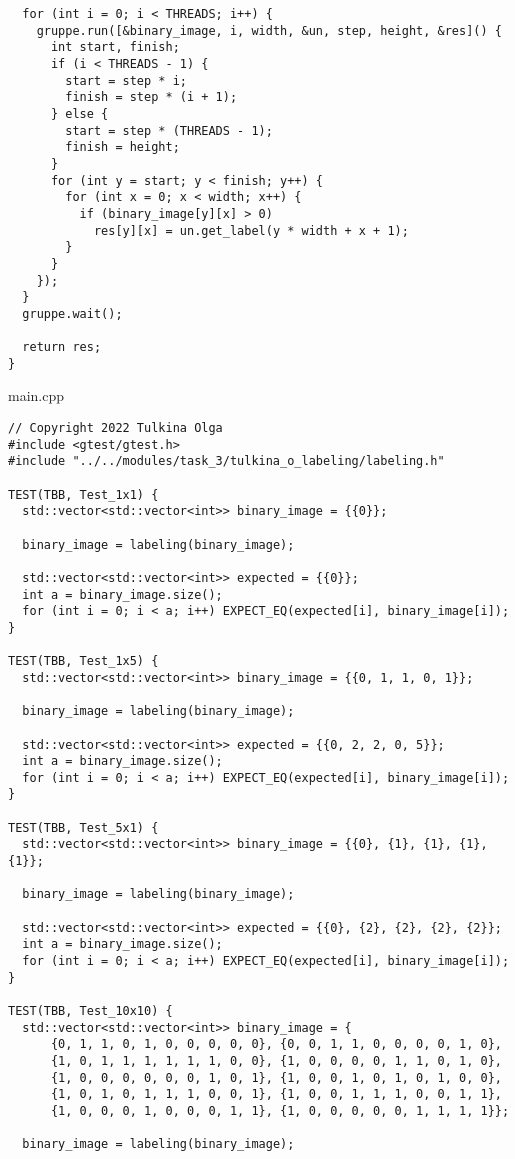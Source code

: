 \documentclass[12pt]{article}
\begin{document}
\begin{lstlisting}
  for (int i = 0; i < THREADS; i++) {
    gruppe.run([&binary_image, i, width, &un, step, height, &res]() {
      int start, finish;
      if (i < THREADS - 1) {
        start = step * i;
        finish = step * (i + 1);
      } else {
        start = step * (THREADS - 1);
        finish = height;
      }
      for (int y = start; y < finish; y++) {
        for (int x = 0; x < width; x++) {
          if (binary_image[y][x] > 0)
            res[y][x] = un.get_label(y * width + x + 1);
        }
      }
    });
  }
  gruppe.wait();

  return res;
}
\end{lstlisting}
main.cpp
\begin{lstlisting}
// Copyright 2022 Tulkina Olga
#include <gtest/gtest.h>
#include "../../modules/task_3/tulkina_o_labeling/labeling.h"

TEST(TBB, Test_1x1) {
  std::vector<std::vector<int>> binary_image = {{0}};

  binary_image = labeling(binary_image);

  std::vector<std::vector<int>> expected = {{0}};
  int a = binary_image.size();
  for (int i = 0; i < a; i++) EXPECT_EQ(expected[i], binary_image[i]);
}

TEST(TBB, Test_1x5) {
  std::vector<std::vector<int>> binary_image = {{0, 1, 1, 0, 1}};

  binary_image = labeling(binary_image);

  std::vector<std::vector<int>> expected = {{0, 2, 2, 0, 5}};
  int a = binary_image.size();
  for (int i = 0; i < a; i++) EXPECT_EQ(expected[i], binary_image[i]);
}

TEST(TBB, Test_5x1) {
  std::vector<std::vector<int>> binary_image = {{0}, {1}, {1}, {1}, {1}};

  binary_image = labeling(binary_image);

  std::vector<std::vector<int>> expected = {{0}, {2}, {2}, {2}, {2}};
  int a = binary_image.size();
  for (int i = 0; i < a; i++) EXPECT_EQ(expected[i], binary_image[i]);
}

TEST(TBB, Test_10x10) {
  std::vector<std::vector<int>> binary_image = {
      {0, 1, 1, 0, 1, 0, 0, 0, 0, 0}, {0, 0, 1, 1, 0, 0, 0, 0, 1, 0},
      {1, 0, 1, 1, 1, 1, 1, 1, 0, 0}, {1, 0, 0, 0, 0, 1, 1, 0, 1, 0},
      {1, 0, 0, 0, 0, 0, 0, 1, 0, 1}, {1, 0, 0, 1, 0, 1, 0, 1, 0, 0},
      {1, 0, 1, 0, 1, 1, 1, 0, 0, 1}, {1, 0, 0, 1, 1, 1, 0, 0, 1, 1},
      {1, 0, 0, 0, 1, 0, 0, 0, 1, 1}, {1, 0, 0, 0, 0, 0, 1, 1, 1, 1}};

  binary_image = labeling(binary_image);


\end{lstlisting}
\end{document}
